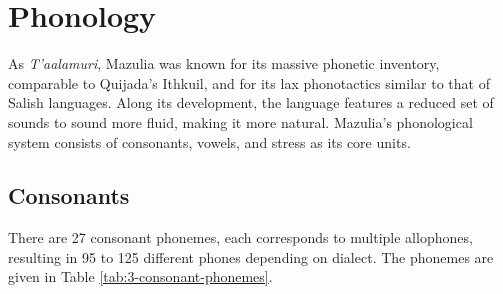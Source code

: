 \chapter{Phonology}

As \textit{T'aalamuri}, Mazulia was known for its massive phonetic inventory, comparable to Quijada's Ithkuil, and for its lax phonotactics similar to that of Salish languages. Along its development, the language features a reduced set of sounds to sound more fluid, making it more natural. Mazulia’s phonological system consists of consonants, vowels, and stress as its core units.

\section{Consonants}
There are 27 consonant phonemes, each corresponds to multiple allophones, resulting in 95 to 125 different phones depending on dialect. The phonemes are given in Table \ref{tab:3-consonant-phonemes}.

